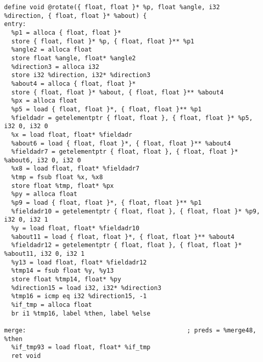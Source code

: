 \documentclass[main.tex]{subfiles}
\begin{document}
{\begin{lstlisting}
define void @rotate({ float, float }* %p, float %angle, i32 %direction, { float, float }* %about) {
entry:
  %p1 = alloca { float, float }*
  store { float, float }* %p, { float, float }** %p1
  %angle2 = alloca float
  store float %angle, float* %angle2
  %direction3 = alloca i32
  store i32 %direction, i32* %direction3
  %about4 = alloca { float, float }*
  store { float, float }* %about, { float, float }** %about4
  %px = alloca float
  %p5 = load { float, float }*, { float, float }** %p1
  %fieldadr = getelementptr { float, float }, { float, float }* %p5, i32 0, i32 0
  %x = load float, float* %fieldadr
  %about6 = load { float, float }*, { float, float }** %about4
  %fieldadr7 = getelementptr { float, float }, { float, float }* %about6, i32 0, i32 0
  %x8 = load float, float* %fieldadr7
  %tmp = fsub float %x, %x8
  store float %tmp, float* %px
  %py = alloca float
  %p9 = load { float, float }*, { float, float }** %p1
  %fieldadr10 = getelementptr { float, float }, { float, float }* %p9, i32 0, i32 1
  %y = load float, float* %fieldadr10
  %about11 = load { float, float }*, { float, float }** %about4
  %fieldadr12 = getelementptr { float, float }, { float, float }* %about11, i32 0, i32 1
  %y13 = load float, float* %fieldadr12
  %tmp14 = fsub float %y, %y13
  store float %tmp14, float* %py
  %direction15 = load i32, i32* %direction3
  %tmp16 = icmp eq i32 %direction15, -1
  %if_tmp = alloca float
  br i1 %tmp16, label %then, label %else

merge:                                            ; preds = %merge48, %then
  %if_tmp93 = load float, float* %if_tmp
  ret void


\end{lstlisting}}
\end{document}
